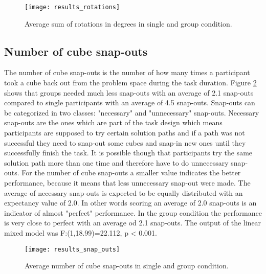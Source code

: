 \begin{figure}[h]
\centering
\texttt{[image: results\_rotations]}
\caption{Average sum of rotations in degrees in single and group condition.}
\label{fig:results_rotations}
\end{figure}

\subsection{Number of cube snap-outs}
The number of cube snap-outs is the number of how many times a participant took a cube back out from the problem space during the task duration. Figure \ref{fig:results_snap_outs} shows that groups needed much less snap-outs with an average of 2.1 snap-outs compared to single participants with an average of 4.5 snap-outs. 
Snap-outs can be categorized in two classes: "necessary" and "unnecessary" snap-outs. Necessary snap-outs are the ones which are part of the task design which means participants are supposed to try certain solution paths and if a path was not successful they need to snap-out some cubes and snap-in new ones until they successfully finish the task. It is possible though that participants try the same solution path more than one time and therefore have to do unnecessary snap-outs. For the number of cube snap-outs a smaller value indicates the better performance, because it means that less unnecessary snap-out were made. The average of necessary snap-outs is expected to be equally distributed with an expectancy value of 2.0. In other words scoring an average of 2.0 snap-outs is an indicator of almost "perfect" performance. In the group condition the performance is very close to perfect with an average od 2.1 snap-outs.
The output of the linear mixed model was F:(1,18.99)=22.112, p < 0.001.

\begin{figure}[h]
\centering
\texttt{[image: results\_snap\_outs]}
\caption{Average number of cube snap-outs in single and group condition.}
\label{fig:results_snap_outs}
\end{figure}

\newpage